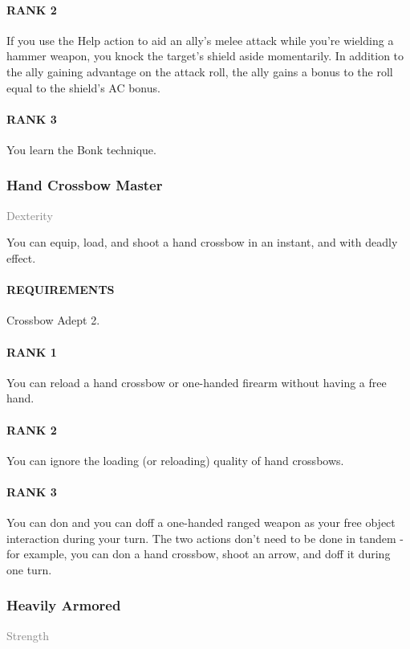 \paragraph{RANK 2} If you use the Help action to aid an ally's melee attack while you're wielding a hammer weapon, you knock the target's shield aside momentarily.
In addition to the ally gaining advantage on the attack roll, the ally gains a bonus to the roll equal to the shield's AC bonus.
\paragraph{RANK 3} You learn the Bonk technique.

\subsubsection{Hand Crossbow Master} \label{feat::handcrossbowmaster}
\small{\textcolor{gray}{Dexterity}}

\normalsize
You can equip, load, and shoot a hand crossbow in an instant, and with deadly effect.
\paragraph{REQUIREMENTS} Crossbow Adept 2.
\paragraph{RANK 1} You can reload a hand crossbow or one-handed firearm without having a free hand.
\paragraph{RANK 2} You can ignore the loading (or reloading) quality of hand crossbows.
\paragraph{RANK 3} You can don and you can doff a one-handed ranged weapon as your free object interaction during your turn.
The two actions don't need to be done in tandem - for example, you can don a hand crossbow, shoot an arrow, and doff it during one turn.

\subsubsection{Heavily Armored} \label{feat::heavilyarmored}
\small{\textcolor{gray}{Strength}}

